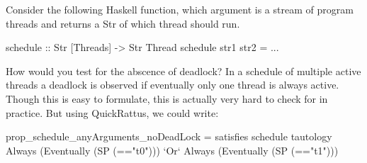 Consider the following Haskell function, which argument is a stream of program threads and returns a Str of which thread should run. 
\begin{hscode}
    schedule :: Str [Threads] -> Str Thread
    schedule str1 str2 = ...
\end{hscode}
How would you test for the abscence of deadlock? In a schedule of multiple active threads a deadlock is observed if eventually only one thread is  always active. Though this is easy to formulate, this is actually very hard to check for in practice. But using QuickRattus, we could write:
\begin{hscode}
    prop_schedule_anyArguments_noDeadLock =
        satisfies
            schedule
            tautology
            Always (Eventually (SP (=="t0"))) `Or` Always (Eventually (SP (=="t1")))
\end{hscode}
